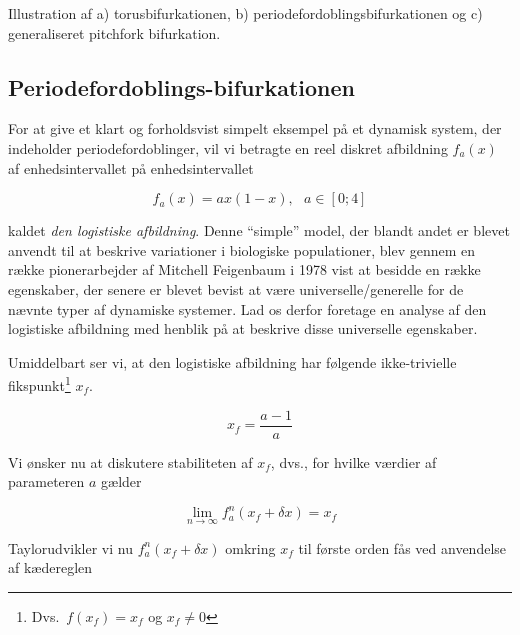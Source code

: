 \vspace*{\fill}

{
\caption{\protect\capsize
Illustration af a) torusbifurkationen, b)
periodefordoblingsbifurkationen og c) generaliseret
pitchfork bifurkation.}
\label{fig:perbifgeo}
}

\vspace*{\fill}

\newpage
\subsection{Periodefordoblings-bifurkationen}
For at give et klart og forholdsvist simpelt eksempel
p{\aa} et dynamisk sy\-stem, der indeholder
periodefordoblinger, vil vi betragte en reel diskret
afbildning $f_a(x)$ af enhedsintervallet p{\aa}
enhedsintervallet

\begin{equation}
 f_a(x) = ax(1-x), \mbox{\ } a \in [0;4]
\end{equation}

kaldet {\em den logistiske afbildning}. Denne ``simple''
model, der blandt andet er blevet anvendt til at beskrive
variationer i biologiske populationer, blev gennem en
r{\ae}kke pionerarbejder af Mitchell Feigenbaum i 1978
\cite{Feig1,Feig2} vist at besidde en r{\ae}kke egenskaber,
der senere er blevet bevist at v{\ae}re
universelle/generelle for de n{\ae}vnte typer af dynamiske
sy\-stemer. Lad os derfor foretage en ana\-lyse af den
logistiske afbildning med henblik p{\aa} at beskrive disse
universelle egenskaber.

\vspace{4.0mm}
Umiddelbart ser vi, at den logistiske afbildning har
f{\o}lgende ikke-trivielle fikspunkt\footnote{Dvs.\ $f(x_f)=x_f$
og $x_f \neq 0$} $x_f$.

\begin{equation}
 x_f = \frac{a-1}{a}
\end{equation}

Vi {\o}nsker nu at diskutere stabiliteten af $x_f$, dvs.,
for hvilke v{\ae}rdier af para\-meteren $a$ g{\ae}lder

\begin{equation}
 \lim_{n \rightarrow \infty} f^n_a(x_f + \delta x) = x_f
\end{equation}

Taylorudvikler vi nu $f^n_a(x_f + \delta x)$ omkring $x_f$
til f{\o}rste orden f{\aa}s ved anvendelse af
k{\ae}dereglen

